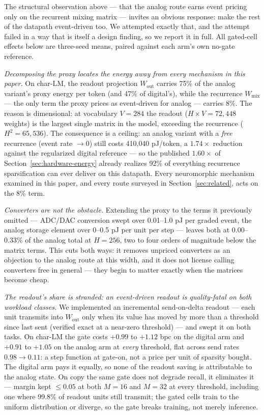 The structural observation above --- that the analog route earns event pricing only on the
recurrent mixing matrix --- invites an obvious response: make the rest of the datapath
event-driven too. We attempted exactly that, and the attempt failed in a way that is
itself a design finding, so we report it in full. All gated-cell effects below are
three-seed means, paired against each arm's own no-gate reference.

\emph{Decomposing the proxy locates the energy away from every mechanism in this paper.}
On char-LM, the readout projection $W_{\mathrm{out}}$ carries 75\% of the analog variant's
proxy energy per token (and 47\% of digital's), while the recurrence $W_{\mathrm{mix}}$
--- the only term the proxy prices as event-driven for analog --- carries 8\%. The reason
is dimensional: at vocabulary $V{=}284$ the readout ($H \times V = 72{,}448$ weights) is
the largest single matrix in the model, exceeding the recurrence ($H^{2} = 65{,}536$).
The consequence is a ceiling: an analog variant with a \emph{free} recurrence (event rate
$\to 0$) still costs 410{,}040 pJ/token, a $1.74\times$ reduction against the regularized
digital reference --- so the published $1.60\times$ of
Section~\ref{sec:hardware-energy} already realizes 92\% of everything recurrence
sparsification can ever deliver on this datapath. Every neuromorphic mechanism examined in
this paper, and every route surveyed in Section~\ref{sec:related}, acts on the 8\% term.

\emph{Converters are not the obstacle.} Extending the proxy to the terms it previously
omitted --- ADC/DAC conversion swept over 0.01--1.0 pJ per graded event, the analog
storage element over 0--0.5 pJ per unit per step --- leaves both at 0.00--0.33\% of the
analog total at $H{=}256$, two to four orders of magnitude below the matrix terms. This
cuts both ways: it removes unpriced converters as an objection to the analog route at this
width, and it does not license calling converters free in general --- they begin to matter
exactly when the matrices become cheap.

\emph{The readout's share is stranded: an event-driven readout is quality-fatal on both
workload classes.} We implemented an incremental send-on-delta readout --- each unit
transmits into $W_{\mathrm{out}}$ only when its value has moved by more than a threshold
since last sent (verified exact at a near-zero threshold) --- and swept it on both tasks.
On char-LM the gate costs $+0.99$ to $+1.12$ bpc on the digital arm and $+0.91$ to $+1.05$
on the analog arm at \emph{every} threshold, flat across send rates $0.98 \to 0.11$: a
step function at gate-on, not a price per unit of sparsity bought. The digital arm pays it
equally, so none of the readout saving is attributable to the analog state. On copy the
same gate does not degrade recall, it eliminates it --- margin kept $\leq 0.05$ at both
$M{=}16$ and $M{=}32$ at every threshold, including one where 99.8\% of readout units
still transmit; the gated cells train to the uniform distribution or diverge, so the gate
breaks training, not merely inference.

